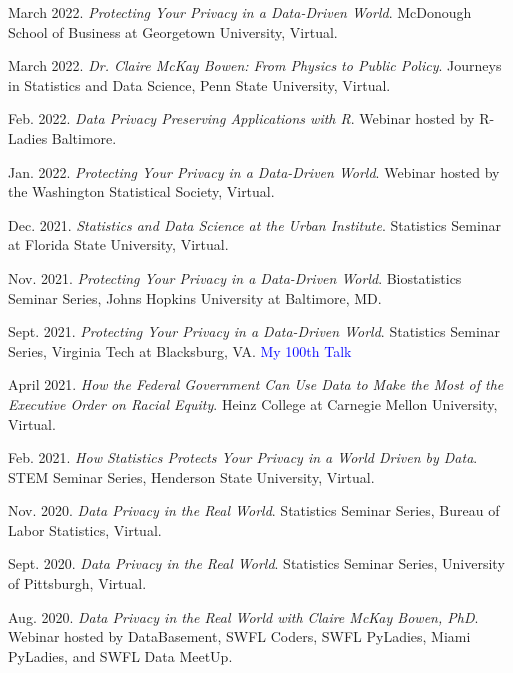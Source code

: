 \documentclass[11pt, letterpaper, roman]{moderncv} %
\begin{document}
\begin{etaremune}[topsep=0pt, itemsep=2pt, partopsep=0pt, parsep=0pt]
    \item March 2022. \textit{Protecting Your Privacy in a Data-Driven World}. McDonough School of Business at Georgetown University, Virtual.
    
    \item March 2022. \textit{Dr. Claire McKay Bowen: From Physics to Public Policy}. Journeys in Statistics and Data Science, Penn State University, Virtual.
        
    \item Feb. 2022. \textit{Data Privacy Preserving Applications with R}. Webinar hosted by R-Ladies Baltimore.

    \item Jan. 2022. \textit{Protecting Your Privacy in a Data-Driven World}. Webinar hosted by the Washington Statistical Society, Virtual.
    
    \item Dec. 2021. \textit{Statistics and Data Science at the Urban Institute}. Statistics Seminar at Florida State University, Virtual.
    
    \item Nov. 2021. \textit{Protecting Your Privacy in a Data-Driven World}. Biostatistics Seminar Series, Johns Hopkins University at Baltimore, MD.
    
    \item Sept. 2021. \textit{Protecting Your Privacy in a Data-Driven World}. Statistics Seminar Series, Virginia Tech at Blacksburg, VA. \textcolor{blue}{My 100th Talk}
    
    \item April 2021. \textit{How the Federal Government Can Use Data to Make the Most of the Executive Order on Racial Equity}. Heinz College at Carnegie Mellon University, Virtual.

    \item Feb. 2021. \textit{How Statistics Protects Your Privacy in a World Driven by Data}. STEM Seminar Series, Henderson State University, Virtual.

    \item Nov. 2020. \textit{Data Privacy in the Real World}. Statistics Seminar Series, Bureau of Labor Statistics, Virtual.

    \item Sept. 2020. \textit{Data Privacy in the Real World}. Statistics Seminar Series, University of Pittsburgh, Virtual.
        
    \item Aug. 2020. \textit{Data Privacy in the Real World with Claire McKay Bowen, PhD}. Webinar hosted by DataBasement, SWFL Coders, SWFL PyLadies, Miami PyLadies, and SWFL Data MeetUp.
    

\end{etaremune}
\end{document}
